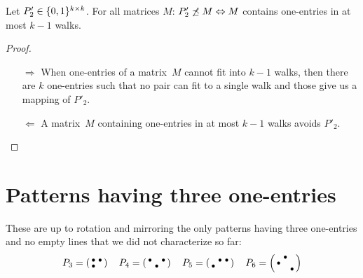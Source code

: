 \begin{prop}
\label{prop:walking}
Let $P'_2\in\{0,1\}^{k\times k}$. For all matrices $M$: $P'_2\not\preceq M\Leftrightarrow M$ contains one-entries in at most $k-1$ walks.
\end{prop}
\begin{proof}
\begin{itemize}
	\item[$\Rightarrow$] When one-entries of a matrix~$M$ cannot fit into $k-1$ walks, then there are $k$ one-entries such that no pair can fit to a single walk and those give us a mapping of $P'_2$.
	\item[$\Leftarrow$] A matrix~$M$ containing one-entries in at most $k-1$ walks avoids $P'_2$.
\end{itemize}
\end{proof}

\section{Patterns having three one-entries}
\label{sec:3ones}
These are up to rotation and mirroring the only patterns having three one-entries and no empty lines that we did not characterize so far:
$$P_3=\smm{\bullet&\bullet\\\bullet& }\ \ 
\ P_4=\smm{\bullet& &\bullet\\ &\bullet& }\ \ 
\ P_5=\smm{ &\bullet&\bullet\\\bullet& & }\ \ 
\ P_6=\smm{ &\bullet& \\\bullet& & \\ & &\bullet}$$


